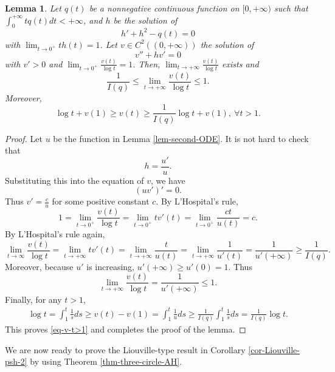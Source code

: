 \documentclass[12pt]{amsart}
\newtheorem{lem}{Lemma}[section]
\theoremstyle{definition}
\theoremstyle{remark}
\numberwithin{equation}{section}
\def\D{\displaystyle}
\begin{document}
\begin{lem}\label{lem-Riccati}
Let $q(t)$ be a nonnegative continuous function on $[0,+\infty)$ such that $\int_0^{+\infty}tq(t)dt<+\infty$, and $h$ be the solution of
\begin{equation}
h'+h^2-q(t)=0
\end{equation}
with $\lim_{t\to 0^+}th(t)=1$. Let $v\in C^2((0,+\infty))$ the solution of
\begin{equation}
v''+hv'=0
\end{equation}
with $v'>0$ and $\D\lim_{t\to 0^+}\frac{v(t)}{\log t}=1$. Then, $\D\lim_{t\to+\infty}\frac{v(t)}{\log t}$ exists and
 $$\frac1{I(q)}\leq \lim_{t\to+\infty}\frac{v(t)}{\log t}\leq 1.$$
 Moreover,
\begin{equation}\label{eq-v-t>1}
\log t+v(1)\geq v(t)\geq \frac{1}{I(q)}\log t+v(1),\ \forall t>1.
\end{equation}

\end{lem}
\begin{proof}
Let $u$ be the function in Lemma \ref{lem-second-ODE}. It is not hard to check that
$$h=\frac{u'}{u}.$$
Substituting this into the equation of $v$, we  have
\begin{equation}
(uv')'=0.
\end{equation}
Thus $v'=\frac{c}{u}$ for some positive constant $c$. By L'Hospital's rule,
$$1=\lim_{t\to 0^+}\frac{v(t)}{\log t}=\lim_{t\to 0^+}tv'(t)=\lim_{t\to 0^+}\frac{ct}{u(t)}=c.$$
By L'Hospital's rule again,
\begin{equation}
\lim_{t\to \infty}\frac{v(t)}{\log t}=\lim_{t\to +\infty}{tv'(t)}=\lim_{t\to +\infty}\frac{t}{u(t)}=\lim_{t\to +\infty}\frac{1}{u'(t)}=\frac1{u'(+\infty)}\geq \frac{1}{I(q)}.
\end{equation}
Moreover, because $u'$ is increasing, $u'(+\infty)\geq u'(0)=1$. Thus
\begin{equation}
\lim_{t\to +\infty}\frac{v(t)}{\log t}=\frac1{u'(+\infty)}\leq 1.
\end{equation}
Finally, for any $t>1$,
\begin{equation}
\begin{split}
\log t=\int_1^t\frac{1}{s}ds\geq v(t)-v(1)=\int_1^t\frac1uds\geq \frac1{I(q)}\int_1^t\frac{1}{s}ds=\frac1{I(q)}\log t.
\end{split}
\end{equation}
This proves \eqref{eq-v-t>1} and completes the proof of the lemma.
\end{proof}
 We are now ready to prove the Liouville-type result in Corollary \ref{cor-Liouville-psh-2} by using Theorem \ref{thm-three-circle-AH}.
\end{document}
